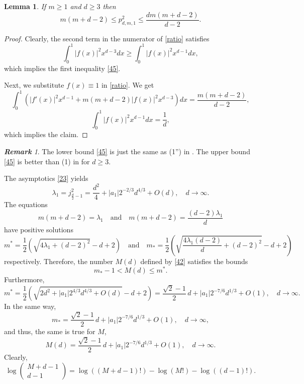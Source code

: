 \documentclass[a4paper,12pt]{article}
\numberwithin{equation}{section}
\def \la{\lambda}
\newcommand{\<}{\langle}
\renewcommand{\>}{\rangle}
\theoremstyle{plain}
\newtheorem{lemma}[theorem]{\bf Lemma}
\theoremstyle{definition}
\theoremstyle{remark}
\newtheorem{rem}[theorem]{\bf Remark}
\renewcommand{\le}{\leqslant}
\renewcommand{\ge}{\geqslant}
\begin{document}
\begin{lemma}
If $m\ge 1$ and $d\ge 3$ then
\begin{equation}
\label{45}
m(m+d-2) \le p_{d,m,1}^2 \le \frac{dm(m+d-2)}{d-2}.
\end{equation}
\end{lemma}

\begin{proof}
Clearly, the second term in the numerator of \eqref{ratio} satisfies
$$
\int_0^1 |f(x)|^2 x^{d-3} dx \ge \int_0^1|f(x)|^2 x^{d-1} dx ,
$$
which implies the first inequality \eqref{45}.

Next, we substitute $f(x) \equiv 1$ in \eqref{ratio}.
We get
$$
\int_0^1\left(|f'(x)|^2 x^{d-1} + m (m+d-2) |f(x)|^2 x^{d-3}\right) dx
= \frac{m(m+d-2)}{d-2},
$$
$$
\int_0^1|f(x)|^2 x^{d-1} dx = \frac1d,
$$
which implies the claim.
\end{proof}

\begin{rem}
The lower bound \eqref{45} is just the same as (1'') in \cite{LS}.
The upper bound \eqref{45} is better than (1) in \cite{LS} for $d \ge 3$.
\end{rem}

The asymptotics \eqref{23} yields
$$
\la_1 = j_{\frac{d}2-1}^2 = \frac{d^2}4 + |a_1| 2^{-2/3} d^{4/3} + O (d),
\quad d \to \infty.
$$
The equations
$$
m (m+d-2) = \la_1 \quad \text{and} \quad
m (m+d-2) = \frac{(d-2)\la_1}{d}
$$
have positive solutions
$$
m^* = \frac12 \left(\sqrt{4\la_1 + (d-2)^2} - d + 2\right)
\quad \text{and} \quad
m_* = \frac12 \left(\sqrt{\frac{4\la_1(d-2)}{d} + (d-2)^2} - d + 2\right)
$$
respectively.
Therefore, the number $M(d)$ defined by \eqref{42} satisfies the bounds
$$
m_*-1 < M (d) \le m^*.
$$
Furthermore,
$$
m^* = \frac12 \left(\sqrt{2 d^2 + |a_1| 2^{4/3} d^{4/3} + O (d)} - d + 2\right)
= \frac{\sqrt 2 - 1}2 \, d + |a_1| 2^{-7/6} d^{1/3} + O (1), \quad d \to \infty.
$$
In the same way,
$$
m_* = \frac{\sqrt 2 - 1}2 \, d + |a_1| 2^{-7/6} d^{1/3} + O (1), \quad d \to \infty,
$$
and thus, the same is true for $M$,
$$
M (d) = \frac{\sqrt 2 - 1}2 \, d + |a_1| 2^{-7/6} d^{1/3} + O (1), \quad d \to \infty.
$$
Clearly,
\begin{equation}
\label{46}
\log \left( \begin{array}{cc} M + d - 1 \\ d-1 \end{array} \right) 
= \log \left((M+d-1)!\right) - \log \left(M!\right) - \log\left((d-1)!\right).
\end{equation}
\end{document}
